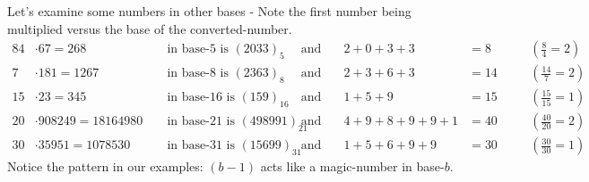 \documentclass{article}
\begin{document}
Let's examine some numbers
in other bases - Note the first number being multiplied versus the base of the converted-number.
\begin{alignat*}{8}
 4&\cdot{}67=268          &&\text{ in base-5 is } (2033)_5       &&\quad\text{and}\quad &     2+0+3+3&=8  &&\quad(\tfrac{8}{4}=2) \\
 7&\cdot{}181=1267        &&\text{ in base-8 is } (2363)_8       &&\quad\text{and}\quad &     2+3+6+3&=14 &&\quad(\tfrac{14}{7}=2) \\
15&\cdot{}23=345          &&\text{ in base-16 is } (159)_{16}    &&\quad\text{and}\quad &       1+5+9&=15 &&\quad(\tfrac{15}{15}=1) \\
20&\cdot{}908249=18164980 &&\text{ in base-21 is } (498991)_{21} &&\quad\text{and}\quad & 4+9+8+9+9+1&=40 &&\quad(\tfrac{40}{20}=2) \\
30&\cdot{}35951=1078530   &&\text{ in base-31 is } (15699)_{31}  &&\quad\text{and}\quad &   1+5+6+9+9&=30 &&\quad(\tfrac{30}{30}=1)
\end{alignat*}
Notice the pattern in our examples:
$(b-1)$ acts like a magic-number in base-$b$.
\end{document}
